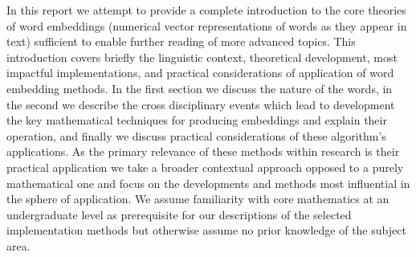 \documentclass{ucetd}
\begin{document}
\maketitle

\tableofcontents

\abstract

In this report we attempt to provide a complete introduction to the core theories of word embeddings (numerical vector representations of words as they appear in text) sufficient to enable further reading of more advanced topics. This introduction covers briefly the linguistic context, theoretical development, most impactful implementations, and practical considerations of application of word embedding methods. In the first section we discuss the nature of the words, in the second we describe the cross disciplinary events which lead to development the key mathematical techniques for producing embeddings and explain their operation, and finally we discuss practical considerations of these algorithm's applications. As the primary relevance of these methods within research is their practical application we take a broader contextual approach opposed to a purely mathematical one and focus on the developments and methods most influential in the sphere of application. We assume familiarity with core mathematics at an undergraduate level as prerequisite for our descriptions of the selected implementation methods but otherwise assume no prior knowledge of the subject area.

\mainmatter









\printglossary
\makebibliography
\end{document}
